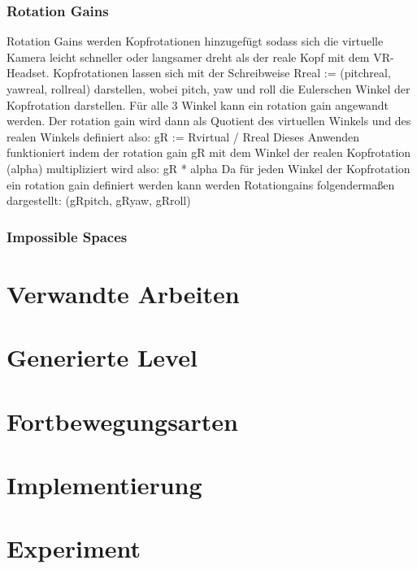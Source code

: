 \subsection{Rotation Gains}
Rotation Gains werden Kopfrotationen hinzugefügt sodass sich die virtuelle Kamera leicht schneller oder langsamer dreht als der reale Kopf mit dem VR-Headset. Kopfrotationen lassen sich mit der Schreibweise Rreal :=
(pitchreal, yawreal, rollreal)
darstellen, wobei pitch, yaw und roll
die Eulerschen Winkel der Kopfrotation darstellen. Für alle 3 Winkel kann ein rotation gain angewandt werden. Der rotation gain wird dann als Quotient des virtuellen Winkels und des realen Winkels definiert also: gR := Rvirtual / Rreal
Dieses Anwenden funktioniert indem der rotation gain gR mit dem Winkel der realen Kopfrotation (alpha) multipliziert wird also: gR * alpha
Da für jeden Winkel der Kopfrotation ein rotation gain definiert werden kann werden Rotationgains folgendermaßen dargestellt: (gRpitch, gRyaw, gRroll)



\subsection{Impossible Spaces}

\chapter{Verwandte Arbeiten}\label{chapter:kapitellabel}

\chapter{Generierte Level}\label{chapter:kapitellabel}

\chapter{Fortbewegungsarten}\label{chapter:kapitellabel}

\chapter{Implementierung}\label{chapter:kapitellabel}

\chapter{Experiment}\label{chapter:kapitellabel}

